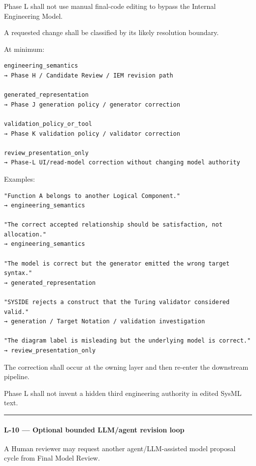 Phase L shall not use manual final-code editing to bypass the Internal Engineering Model.

A requested change shall be classified by its likely resolution boundary.

At minimum:

\begin{verbatim}
engineering_semantics
→ Phase H / Candidate Review / IEM revision path

generated_representation
→ Phase J generation policy / generator correction

validation_policy_or_tool
→ Phase K validation policy / validator correction

review_presentation_only
→ Phase-L UI/read-model correction without changing model authority
\end{verbatim}

Examples:

\begin{verbatim}
"Function A belongs to another Logical Component."
→ engineering_semantics

"The correct accepted relationship should be satisfaction, not allocation."
→ engineering_semantics

"The model is correct but the generator emitted the wrong target syntax."
→ generated_representation

"SYSIDE rejects a construct that the Turing validator considered valid."
→ generation / Target Notation / validation investigation

"The diagram label is misleading but the underlying model is correct."
→ review_presentation_only
\end{verbatim}

The correction shall occur at the owning layer and then re-enter the downstream pipeline.

Phase L shall not invent a hidden third engineering authority in edited SysML text.

\begin{center}\rule{0.5\linewidth}{0.5pt}\end{center}

\hypertarget{l-10--optional-bounded-llmagent-revision-loop}{%
\paragraph{L-10 --- Optional bounded LLM/agent revision loop}\label{l-10--optional-bounded-llmagent-revision-loop}}

A Human reviewer may request another agent/LLM-assisted model proposal cycle from Final Model Review.

